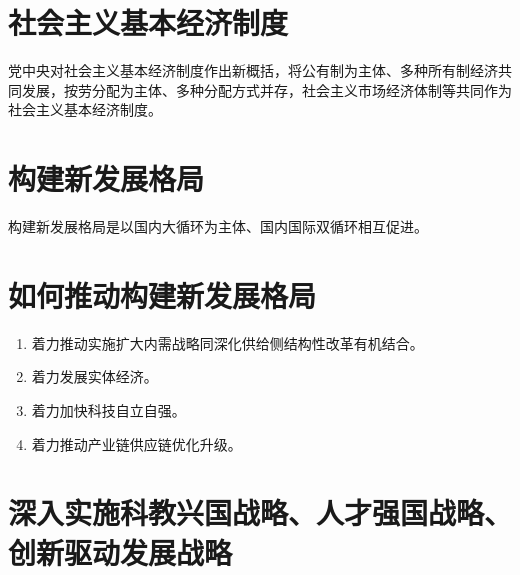 \documentclass[12pt, a4paper, oneside]{ctexbook}
\begin{document}
\section{社会主义基本经济制度}

党中央对社会主义基本经济制度作出新概括，将公有制为主体、多种所有制经济共同发展，按劳分配为主体、多种分配方式并存，社会主义市场经济体制等共同作为社会主义基本经济制度。

\section{构建新发展格局}

构建新发展格局是以国内大循环为主体、国内国际双循环相互促进。

\section{如何推动构建新发展格局}

\begin{enumerate}
\item 着力推动实施扩大内需战略同深化供给侧结构性改革有机结合。

\item 着力发展实体经济。

\item 着力加快科技自立自强。

\item 着力推动产业链供应链优化升级。
\end{enumerate}

\section{深入实施科教兴国战略、人才强国战略、创新驱动发展战略}
\end{document}
